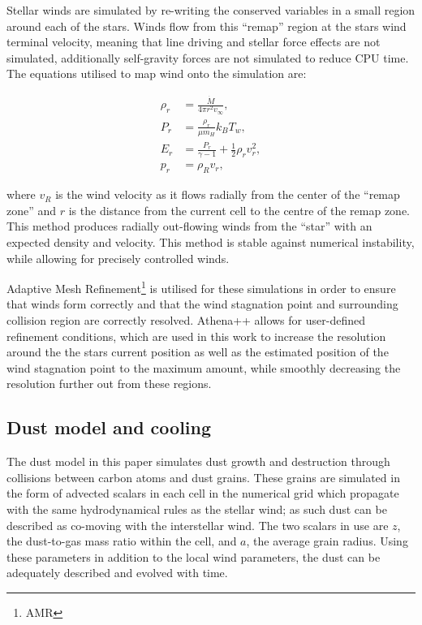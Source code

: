 
Stellar winds are simulated by re-writing the conserved variables in a small region around each of the stars.
Winds flow from this ``remap'' region at the stars wind terminal velocity, meaning that line driving and stellar force effects are not simulated, additionally self-gravity forces are not simulated to reduce CPU time.
The equations utilised to map wind onto the simulation are:

\begin{subequations}
  \begin{align}
    \rho_r & = \frac{\dot M}{4 \pi r^2 v_\infty} , \\
    P_r    & = \frac{\rho_r}{\mu m_H} k_B T_w , \\
    E_r    & = \frac{P_r}{\gamma - 1} + \frac{1}{2} \rho_{r} v_{r}^2 , \\
    p_{r}  & = \rho_R v_{r} , 
  \end{align}
\end{subequations}

where $v_R$ is the wind velocity as it flows radially from the center of the ``remap zone'' and $r$ is the distance from the current cell to the centre of the remap zone.
This method produces radially out-flowing winds from the ``star'' with an expected density and velocity.
This method is stable against numerical instability, while allowing for precisely controlled winds.


Adaptive Mesh Refinement\footnote{AMR} is utilised for these simulations in order to ensure that winds form correctly and that the wind stagnation point and surrounding collision region are correctly resolved.
Athena++ allows for user-defined refinement conditions, which are used in this work to increase the resolution around the the stars current position as well as the estimated position of the wind stagnation point to the maximum amount, while smoothly decreasing the resolution further out from these regions. 


\subsection{Dust model and cooling}

The dust model in this paper simulates dust growth and destruction through collisions between carbon atoms and dust grains. These grains are simulated in the form of advected scalars in each cell in the numerical grid which propagate with the same hydrodynamical rules as the stellar wind; as such dust can be described as co-moving with the interstellar wind. The two scalars in use are $z$, the dust-to-gas mass ratio within the cell, and $a$, the average grain radius. Using these parameters in addition to the local wind parameters, the dust can be adequately described and evolved with time. %

